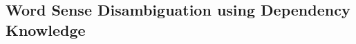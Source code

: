 \documentclass[12 pt]{article}
\begin{document}

\subsection{Word Sense Disambiguation using Dependency Knowledge}
\label{treematching}
\end{document}
